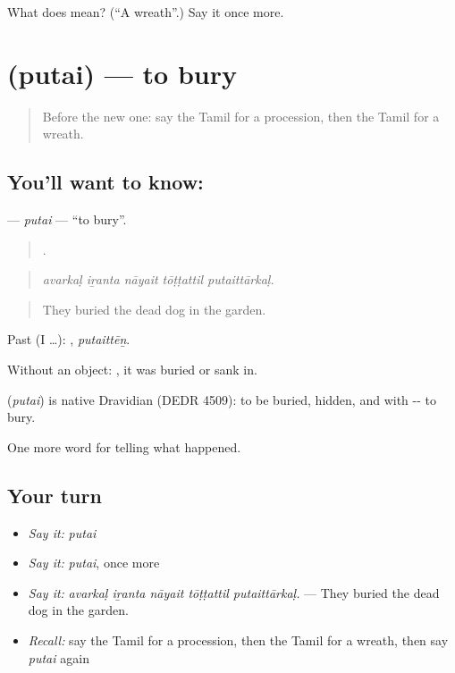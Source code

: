 \begin{tcolorbox}[breakable,colback=teal!4,colframe=teal!35!black,title={Before you move on}]
What does  mean? (\textquotedblleft{}A wreath\textquotedblright{}.) Say it once more.
\end{tcolorbox}
\section[\texorpdfstring{\ta{புதை} (putai)}{புதை (putai)}]{ (putai) — to bury}

\label{lesson:TA-C323-putai}



\begin{quote}
Before the new one: say the Tamil for a procession, then the Tamil for a wreath.
\end{quote}

\subsection*{You'll want to know: }
\textbf{} — \emph{putai} — \textquotedblleft{}to bury\textquotedblright{}.

\begin{quote}
    .
\end{quote}

\begin{quote}
\emph{avarkaḷ iṟanta nāyait tōṭṭattil putaittārkaḷ.}
\end{quote}

\begin{quote}
They buried the dead dog in the garden.
\end{quote}

Past (I …): , \emph{putaittēṉ}.

Without an object: , it was buried or sank in.

\begin{cousinweb}
\textbf{} (\emph{putai}) is native Dravidian (DEDR 4509): to be buried, hidden, and with -- to bury.
\end{cousinweb}

\begin{grammarlens}[title={What you've built}]
One more word for telling what happened.
\end{grammarlens}

\subsection*{Your turn}
\begin{itemize}
\raggedright
  \item \emph{Say it:} \emph{putai}
  \item \emph{Say it:} \emph{putai}, once more
  \item \emph{Say it:} \emph{avarkaḷ iṟanta nāyait tōṭṭattil putaittārkaḷ.} — They buried the dead dog in the garden.
  \item \emph{Recall:} say the Tamil for a procession, then the Tamil for a wreath, then say \emph{putai} again
\end{itemize}


